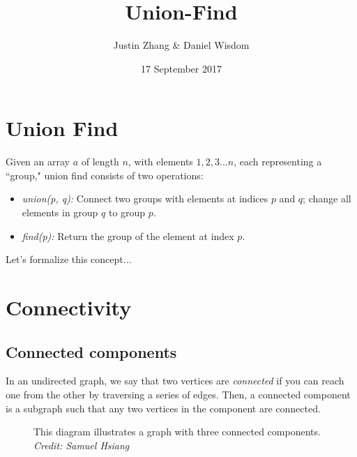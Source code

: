 \documentclass{article}
\title{Union-Find}
\author{Justin Zhang & Daniel Wisdom}
\date{17 September 2017}
\begin{document}
\maketitle

\section{Union Find}
    Given an array $a$ of length $n$, with elements $1, 2, 3 ... n$, each representing a ``group," union find consists of two operations:
    \begin{itemize}
    \item \textit{union(p, q):} Connect two groups with elements at indices $p$ and $q$; change all elements in group $q$ to group $p$.
    \item \textit{find(p):} Return the group of the element at index $p$.
    \end{itemize}

    Let's formalize this concept...
\section{Connectivity}
\subsection{Connected components}
In an undirected graph, we say that two vertices are \textit{connected} if you can reach one from the other by traversing a series of edges. Then, a connected component is a subgraph such that any two vertices in the component are connected.

\begin{figure}[h]
\centering
{}
\caption{This diagram illustrates a graph with three connected components. \textit{Credit: Samuel Hsiang}}
\end{figure}
\end{document}

